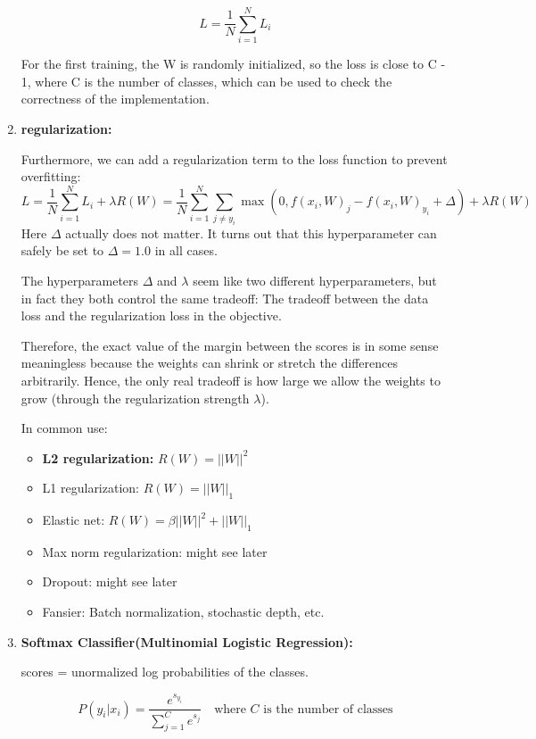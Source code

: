 \documentclass{article}
\numberwithin{equation}{section}
\begin{document}
\begin{CJK}{UTF8}{gbsn}
\begin{enumerate}
    \begin{equation}
        L = \frac{1}{N} \sum_{i=1}^{N} L_i
    \end{equation}

    For the first training, the W is randomly initialized, so the loss is close to C - 1, where C is the number of classes, which can be used to check the correctness of the implementation.\par

    \item \textbf{regularization:}\par
    Furthermore, we can add a regularization term to the loss function to prevent overfitting:
    \begin{equation}
        L = \frac{1}{N} \sum_{i=1}^{N} L_i + \lambda R(W) = \frac{1}{N} \sum_{i=1}^{N} \sum_{j \neq y_i} \max(0, f(x_i, W)_j - f(x_i, W)_{y_i} + \Delta) + \lambda R(W)
    \end{equation}
    Here \(\Delta\) actually does not matter. It turns out that this hyperparameter can safely be set to \(\Delta=1.0\) in all cases.\par
    The hyperparameters \(\Delta\) and \(\lambda\) seem like two different hyperparameters, but in fact they both control the same tradeoff: The tradeoff between the data loss and the regularization loss in the objective.\par
    Therefore, the exact value of the margin between the scores is in some sense meaningless because the weights can shrink or stretch the differences arbitrarily. Hence, the only real tradeoff is how large we allow the weights to grow (through the regularization strength \(\lambda\)).\par
    In common use:
    \begin{itemize}    
        \item \textbf{L2 regularization:} \(R(W) = ||W||^2\)
        \item L1 regularization: \(R(W) = ||W||_1\)
        \item Elastic net: \(R(W) = \beta ||W||^2 + ||W||_1\)
        \item Max norm regularization: might see later
        \item Dropout: might see later
        \item Fansier: Batch normalization, stochastic depth, etc.
    \end{itemize}

    \item \textbf{Softmax Classifier(Multinomial Logistic Regression):}\par
    scores = unormalized log probabilities of the classes.\par
    \begin{equation}
        P(y_i | x_i) = \frac{e^{s_{y_i}}}{\sum_{j=1}^{C} e^{s_j}} \quad \text{where } C \text{ is the number of classes}
    \end{equation}


\end{enumerate}
\end{CJK}
\end{document}
